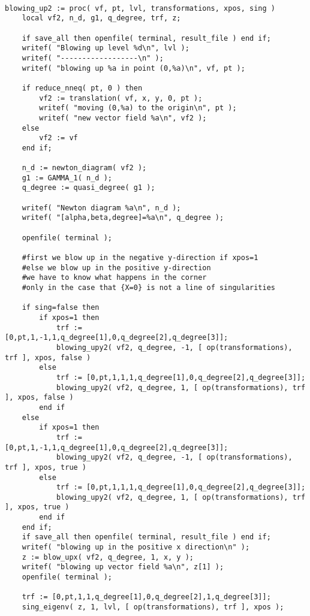 \documentclass[a4paper,10pt]{article}
\begin{document}
\begin{lstlisting}[name=blowup]

blowing_up2 := proc( vf, pt, lvl, transformations, xpos, sing )
    local vf2, n_d, g1, q_degree, trf, z;

    if save_all then openfile( terminal, result_file ) end if;
    writef( "Blowing up level %d\n", lvl );
    writef( "------------------\n" );
    writef( "blowing up %a in point (0,%a)\n", vf, pt );

    if reduce_nneq( pt, 0 ) then
        vf2 := translation( vf, x, y, 0, pt );
        writef( "moving (0,%a) to the origin\n", pt );
        writef( "new vector field %a\n", vf2 );
    else
        vf2 := vf
    end if;

    n_d := newton_diagram( vf2 );
    g1 := GAMMA_1( n_d );
    q_degree := quasi_degree( g1 );

    writef( "Newton diagram %a\n", n_d );
    writef( "[alpha,beta,degree]=%a\n", q_degree );

    openfile( terminal );

    #first we blow up in the negative y-direction if xpos=1
    #else we blow up in the positive y-direction
    #we have to know what happens in the corner
    #only in the case that {X=0} is not a line of singularities

    if sing=false then
        if xpos=1 then
            trf := [0,pt,1,-1,1,q_degree[1],0,q_degree[2],q_degree[3]];
            blowing_upy2( vf2, q_degree, -1, [ op(transformations), trf ], xpos, false )
        else
            trf := [0,pt,1,1,1,q_degree[1],0,q_degree[2],q_degree[3]];
            blowing_upy2( vf2, q_degree, 1, [ op(transformations), trf ], xpos, false )
        end if
    else
        if xpos=1 then
            trf := [0,pt,1,-1,1,q_degree[1],0,q_degree[2],q_degree[3]];
            blowing_upy2( vf2, q_degree, -1, [ op(transformations), trf ], xpos, true )
        else
            trf := [0,pt,1,1,1,q_degree[1],0,q_degree[2],q_degree[3]];
            blowing_upy2( vf2, q_degree, 1, [ op(transformations), trf ], xpos, true )
        end if
    end if;
    if save_all then openfile( terminal, result_file ) end if;
    writef( "blowing up in the positive x direction\n" );
    z := blow_upx( vf2, q_degree, 1, x, y );
    writef( "blowing up vector field %a\n", z[1] );
    openfile( terminal );

    trf := [0,pt,1,1,q_degree[1],0,q_degree[2],1,q_degree[3]];
    sing_eigenv( z, 1, lvl, [ op(transformations), trf ], xpos );


\end{lstlisting}
\end{document}
